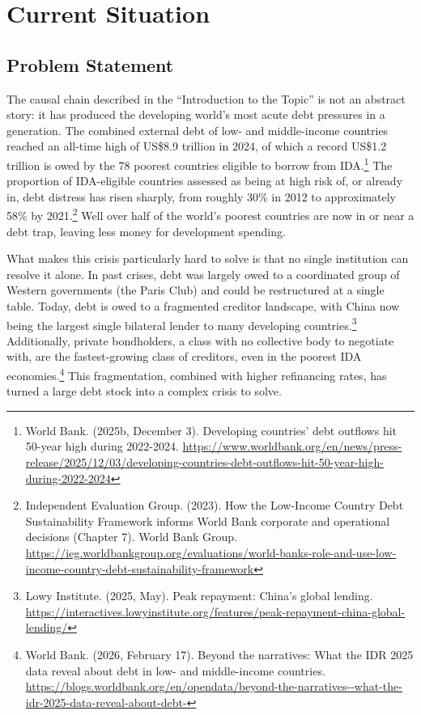 \section{Current Situation}

\subsection{Problem Statement}

The causal chain described in the “Introduction to the Topic” is not an abstract story: it has produced the developing world’s most acute debt pressures in a generation. The combined external debt of low- and middle-income countries reached an all-time high of US\$8.9 trillion in 2024, of which a record US\$1.2 trillion is owed by the 78 poorest countries eligible to borrow from IDA.\footnote{World Bank. (2025b, December 3). Developing countries’ debt outflows hit 50-year high during 2022-2024. \url{https://www.worldbank.org/en/news/press-release/2025/12/03/developing-countries-debt-outflows-hit-50-year-high-during-2022-2024}} The proportion of IDA-eligible countries assessed as being at high risk of, or already in, debt distress has risen sharply, from roughly 30\% in 2012 to approximately 58\% by 2021.\footnote{Independent Evaluation Group. (2023). How the Low-Income Country Debt Sustainability Framework informs World Bank corporate and operational decisions (Chapter 7). World Bank Group. \url{https://ieg.worldbankgroup.org/evaluations/world-banks-role-and-use-low-income-country-debt-sustainability-framework}} Well over half of the world’s poorest countries are now in or near a debt trap, leaving less money for development spending.

What makes this crisis particularly hard to solve is that no single institution can resolve it alone. In past crises, debt was largely owed to a coordinated group of Western governments (the Paris Club) and could be restructured at a single table. Today, debt is owed to a fragmented creditor landscape, with China now being the largest single bilateral lender to many developing countries.\footnote{Lowy Institute. (2025, May). Peak repayment: China’s global lending. \url{https://interactives.lowyinstitute.org/features/peak-repayment-china-global-lending/}} Additionally, private bondholders, a class with no collective body to negotiate with, are the fastest-growing class of creditors, even in the poorest IDA economies.\footnote{World Bank. (2026, February 17). Beyond the narratives: What the IDR 2025 data reveal about debt in low- and middle-income countries. \url{https://blogs.worldbank.org/en/opendata/beyond-the-narratives--what-the-idr-2025-data-reveal-about-debt-}} This fragmentation, combined with higher refinancing rates, has turned a large debt stock into a complex crisis to solve.

